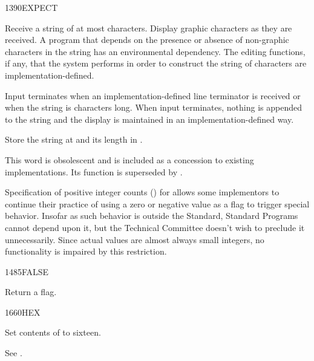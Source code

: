 \begin{worddef}{1390}{EXPECT}
\item {}

	Receive a string of at most  characters. Display graphic
	characters as they are received. A program that depends on
	the presence or absence of non-graphic characters in the
	string has an environmental dependency. The editing functions,
	if any, that the system performs in order to construct the
	string of characters are implementation-defined.

	Input terminates when an implementation-defined line terminator
	is received or when the string is  characters long. When
	input terminates, nothing is appended to the string and the
	display is maintained in an implementation-defined way.

	Store the string at  and its length in .

\note
	This word is obsolescent and is included as a concession to
	existing implementations. Its function is superseded
	by .

	\begin{defer}
	\rationale %
		Specification of positive integer counts () for
		 allows some implementors to continue their
		practice of using a zero or negative value as a flag to
		trigger special behavior. Insofar as such behavior is outside
		the Standard, Standard Programs cannot depend upon it, but
		the Technical Committee doesn't wish to preclude it
		unnecessarily. Since actual values are almost always small
		integers, no functionality is impaired by this restriction.
	\end{defer}
\end{worddef}


\begin{worddef}{1485}{FALSE}
\item {}

	Return a  flag.

\see {}
\end{worddef}


\begin{worddef}{1660}{HEX}
\item \stack{}{}

	Set contents of  to sixteen.

	\begin{defer}
	\testing*
		See \rref{core:BASE}{BASE}.
	\end{defer}
\end{worddef}


